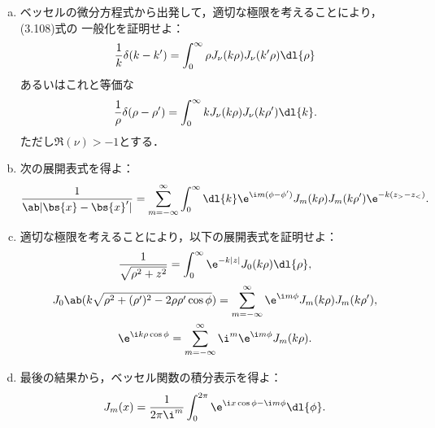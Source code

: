 \begin{bx1}
  \begin{enumerate}[(a)]%
    \item ベッセルの微分方程式から出発して，適切な極限を考えることにより，(3.108)式の
      一般化を証明せよ：
      \begin{gather}%
        \frac{1}{k} \delta(k - k') = \int_0^\infty \rho J_\nu(k\rho) J_\nu(k'\rho) \dl{\rho}
      \end{gather}%
      あるいはこれと等価な
      \begin{gather}%
        \frac{1}{\rho} \delta(\rho -\rho') = \int_0^\infty k J_\nu(k\rho) J_\nu(k\rho') \dl{k}.
      \end{gather}%
      ただし$\Re(\nu) > -1$とする．
    \item 
      次の展開表式を得よ：
      \begin{gather}%
        \frac{1}{\ab|\bs{x} - \bs{x}'|} = \sum_{m=-\infty}^\infty \int_0^\infty \dl{k} \e^{\i m(\phi-\phi')} J_m(k\rho) J_m(k\rho') \e^{-k(z_> - z_<)}.
      \end{gather}%
    \item
      適切な極限を考えることにより，以下の展開表式を証明せよ：
      \begin{gather}%
        \frac{1}{\sqrt{\rho^2 + z^2}} = \int_0^\infty \e^{-k|z|} J_0(k\rho)\dl{\rho},\\
        J_0\ab(k\sqrt{\rho^2 + (\rho')^2- 2\rho \rho'\cos\phi}) = \sum_{m=-\infty}^\infty \e^{\i m\phi}J_m(k\rho) J_m(k\rho'),\\
        \e^{\i k\rho\cos\phi} = \sum_{m=-\infty}^\infty \i^m \e^{\i m\phi} J_m(k\rho).
      \end{gather}%
    \item
      最後の結果から，ベッセル関数の積分表示を得よ：
      \begin{gather}%
        J_m(x) = \frac{1}{2\pi\i^m} \int_0^{2\pi} \e^{\i x \cos\phi - \i m \phi}\dl{\phi}.
      \end{gather}%
  \end{enumerate}%
\end{bx1}
\clearpage
